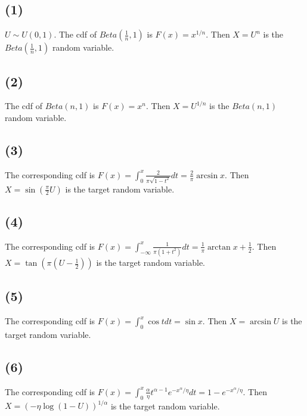 \documentclass[11pt]{article}
\begin{document}
    \hypertarget{section}{%
\subsection{(1)}\label{section}}

    \(U\sim U(0,1)\). The cdf of \(Beta(\frac{1}{n},1)\) is
\(F(x)=x^{1/n}\). Then \(X=U^n\) is the \(Beta(\frac{1}{n},1)\) random
variable.

    \hypertarget{section}{%
\subsection{(2)}\label{section}}

    The cdf of \(Beta(n,1)\) is \(F(x)=x^n\). Then \(X=U^{1/n}\) is the
\(Beta(n,1)\) random variable.

    \hypertarget{section}{%
\subsection{(3)}\label{section}}

    The corresponding cdf is
\(F(x)=\int_0^{x} \frac{2}{\pi\sqrt{1-t^2}} dt=\frac{2}{\pi}\arcsin x\).
Then \(X=\sin(\frac{\pi}{2}U)\) is the target random variable.

    \hypertarget{section}{%
\subsection{(4)}\label{section}}

    The corresponding cdf is
\(F(x)=\int_{-\infty}^x \frac{1}{\pi(1+t^2)}dt=\frac{1}{\pi}\arctan x+\frac{1}{2}\).
Then \(X=\tan(\pi(U-\frac{1}{2}))\) is the target random variable.

    \hypertarget{section}{%
\subsection{(5)}\label{section}}

    The corresponding cdf is \(F(x)=\int_{0}^x \cos t dt=\sin x\). Then
\(X=\arcsin U\) is the target random variable.

    \hypertarget{section}{%
\subsection{(6)}\label{section}}

    The corresponding cdf is
\(F(x)=\int_0^x \frac{\alpha}{\eta} t^{\alpha-1}e^{-x^{\alpha}/\eta} dt=1-e^{-x^{\alpha}/\eta}\).
Then \(X=\left(-\eta\log(1-U)\right)^{1/\alpha}\) is the target random
variable.
\end{document}
